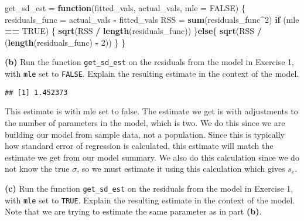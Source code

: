 \documentclass[]{article}
\newenvironment{Shaded}{\begin{snugshade}}{\end{snugshade}}
\newcommand{\KeywordTok}[1]{\textcolor[rgb]{0.13,0.29,0.53}{\textbf{#1}}}
\newcommand{\DataTypeTok}[1]{\textcolor[rgb]{0.13,0.29,0.53}{#1}}
\newcommand{\DecValTok}[1]{\textcolor[rgb]{0.00,0.00,0.81}{#1}}
\newcommand{\StringTok}[1]{\textcolor[rgb]{0.31,0.60,0.02}{#1}}
\newcommand{\OtherTok}[1]{\textcolor[rgb]{0.56,0.35,0.01}{#1}}
\newcommand{\ControlFlowTok}[1]{\textcolor[rgb]{0.13,0.29,0.53}{\textbf{#1}}}
\newcommand{\OperatorTok}[1]{\textcolor[rgb]{0.81,0.36,0.00}{\textbf{#1}}}
\newcommand{\NormalTok}[1]{#1}
\begin{document}
\begin{Shaded}
\begin{Highlighting}[]
\NormalTok{get_sd_est =}\StringTok{ }\ControlFlowTok{function}\NormalTok{(fitted_vals, actual_vals, }\DataTypeTok{mle =} \OtherTok{FALSE}\NormalTok{) \{}
\NormalTok{  residuals_func =}\StringTok{ }\NormalTok{actual_vals }\OperatorTok{-}\StringTok{ }\NormalTok{fitted_vals}
\NormalTok{  RSS =}\StringTok{ }\KeywordTok{sum}\NormalTok{(residuals_func}\OperatorTok{^}\DecValTok{2}\NormalTok{)}
  \ControlFlowTok{if}\NormalTok{ (mle }\OperatorTok{==}\StringTok{ }\OtherTok{TRUE}\NormalTok{) \{}
    \KeywordTok{sqrt}\NormalTok{(RSS }\OperatorTok{/}\StringTok{ }\KeywordTok{length}\NormalTok{(residuals_func))}
\NormalTok{  \}}\ControlFlowTok{else}\NormalTok{\{}
    \KeywordTok{sqrt}\NormalTok{(RSS }\OperatorTok{/}\StringTok{ }\NormalTok{(}\KeywordTok{length}\NormalTok{(residuals_func) }\OperatorTok{-}\StringTok{ }\DecValTok{2}\NormalTok{))}
\NormalTok{  \}}
\NormalTok{\}}
\end{Highlighting}
\end{Shaded}

\textbf{(b)} Run the function \texttt{get\_sd\_est} on the residuals
from the model in Exercise 1, with \texttt{mle} set to \texttt{FALSE}.
Explain the resulting estimate in the context of the model.

\begin{Shaded}
\end{Shaded}

\begin{verbatim}
## [1] 1.452373
\end{verbatim}

This estimate is with mle set to false. The estimate we get is with
adjustments to the number of parameters in the model, which is two. We
do this since we are building our model from sample data, not a
population. Since this is typically how standard error of regression is
calculated, this estimate will match the estimate we get from our model
summary. We also do this calculation since we do not know the true
\({\sigma}\), so we must estimate it using this calculation which gives
\(s_e\).

\textbf{(c)} Run the function \texttt{get\_sd\_est} on the residuals
from the model in Exercise 1, with \texttt{mle} set to \texttt{TRUE}.
Explain the resulting estimate in the context of the model. Note that we
are trying to estimate the same parameter as in part \textbf{(b)}.
\end{document}
